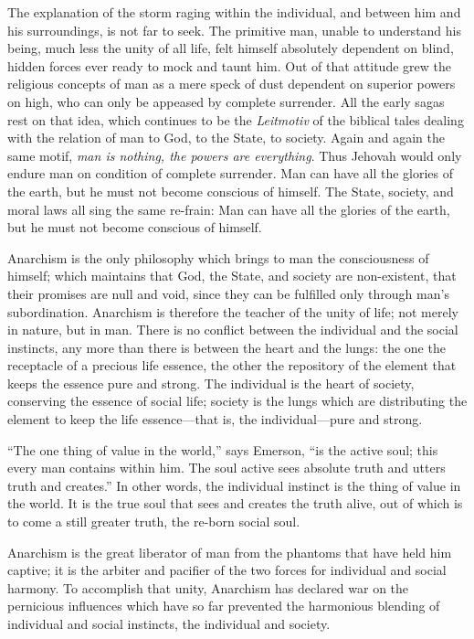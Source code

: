 The explanation of the storm raging within the individual, and between
him and his surroundings, is not far to seek. The primitive man,
unable to understand his being, much less the unity of all life, felt
himself absolutely dependent on blind, hidden forces ever ready to
mock and taunt him. Out of that attitude grew the religious concepts
of man as a mere speck of dust dependent on superior powers on high,
who can only be appeased by complete surrender. All the early sagas
rest on that idea, which continues to be the \textit{Leitmotiv} of the
biblical tales dealing with the relation of man to God, to the State,
to society. Again and again the same motif, \textit{man is nothing,
the powers are everything}. Thus Jehovah would only endure man on
condition of complete surrender. Man can have all the glories of the
earth, but he must not become conscious of himself. The State,
society, and moral laws all sing the same re-frain: Man can
have all the glories of the earth, but he must not become conscious of
himself.

Anarchism is the only philosophy which brings to man the consciousness
of himself; which maintains that God, the State, and society are
non-existent, that their promises are null and void, since they can be
fulfilled only through man's subordination. Anarchism is therefore the
teacher of the unity of life; not merely in nature, but in man. There
is no conflict between the individual and the social instincts, any
more than there is between the heart and the lungs: the one the
receptacle of a precious life essence, the other the repository of the
element that keeps the essence pure and strong. The individual is the
heart of society, conserving the essence of social life; society is
the lungs which are distributing the element to keep the life
essence---that is, the in\-di\-vid\-u\-al---pure and strong.

``The one thing of value in the world,'' says Emerson, ``is the active
soul; this every man contains within him. The soul active sees
absolute truth and utters truth and creates.'' In other words, the
individual instinct is the thing of value in the world. It is the true
soul that sees and creates the truth alive, out of which is to come a
still greater truth, the re-born social soul.

Anarchism is the great liberator of man from the phantoms that have
held him captive; it is the arbiter and pacifier of the two forces for
individual and social harmony. To accomplish that unity, Anarchism has
declared war on the pernicious influences which have so far prevented
the harmonious  blending of individual and social instincts,
the individual and society.

